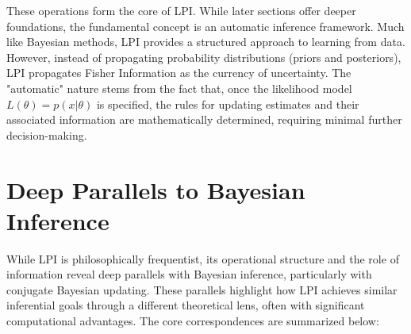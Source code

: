 \documentclass[11pt]{article}
\begin{document}
These operations form the core of LPI. While later sections offer deeper foundations, the fundamental concept is an automatic inference framework. Much like Bayesian methods, LPI provides a structured approach to learning from data. However, instead of propagating probability distributions (priors and posteriors), LPI propagates Fisher Information as the currency of uncertainty. The "automatic" nature stems from the fact that, once the likelihood model $L(\theta) = p(x|\theta)$ is specified, the rules for updating estimates and their associated information are mathematically determined, requiring minimal further decision-making.

\section{Deep Parallels to Bayesian Inference}

While LPI is philosophically frequentist, its operational structure and the role of information reveal deep parallels with Bayesian inference, particularly with conjugate Bayesian updating. These parallels highlight how LPI achieves similar inferential goals through a different theoretical lens, often with significant computational advantages. The core correspondences are summarized below:
\end{document}
